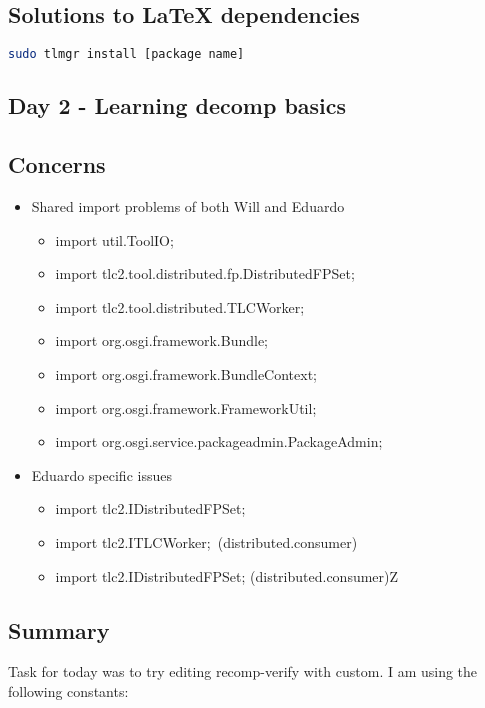 \documentclass[11pt]{article}
\begin{document}
\subsection*{Solutions to LaTeX dependencies}
\begin{lstlisting}[language=bash]
  sudo tlmgr install [package name]
\end{lstlisting}

\subsection{Day 2 - Learning decomp basics}
\subsection*{Concerns}
\begin{itemize}
  \item Shared import problems of both Will and Eduardo
  \begin{itemize}
    \item import util.ToolIO;
    \item import tlc2.tool.distributed.fp.DistributedFPSet;
    \item import tlc2.tool.distributed.TLCWorker;
    \item import org.osgi.framework.Bundle;
    \item import org.osgi.framework.BundleContext;
    \item import org.osgi.framework.FrameworkUtil;
    \item import org.osgi.service.packageadmin.PackageAdmin;
  \end{itemize}
  \item Eduardo specific issues
  \begin{itemize}
    \item import tlc2.IDistributedFPSet;\
    \item import tlc2.ITLCWorker;\ (distributed.consumer)
    \item import tlc2.IDistributedFPSet; (distributed.consumer)Z
  \end{itemize}

\end{itemize}

\subsection*{Summary}
Task for today was to try editing recomp-verify with custom.
I am using the following constants:
\end{document}

